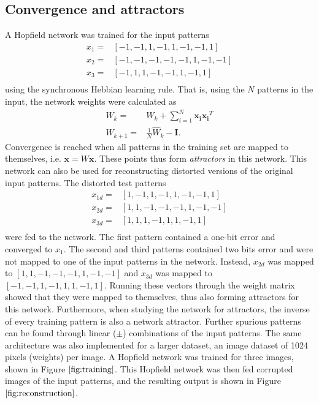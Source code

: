 \documentclass[a4paper]{article}
\begin{document}
\subsection{Convergence and attractors}
A Hopfield network was trained for the input patterns
\begin{align*}
  x_1 =& [-1, -1, 1, -1, 1, -1, -1, 1] \\
  x_2 =& [-1, -1, -1, -1, -1, 1, -1, -1] \\
  x_3 =& [-1, 1, 1, -1, -1, 1, -1, 1] \\
\end{align*}
using the synchronous Hebbian learning rule. That is, using the $N$ patterns in the input, the network weights were calculated as 
\begin{align*}
  \hat{W}_{k} =& W_k + \sum_{i=1}^N \mathbf{x_i} \mathbf{x_i}^T \\
  W_{k+1} =& \frac{1}{N} \hat{W}_{k} - \mathbf{I}.
\end{align*}
Convergence is reached when all patterns in the training set are mapped to themselves, i.e. $\mathbf{x} = W\mathbf{x}$. These points thus form \textit{attractors} in this network.
This network can also be used for reconstructing distorted versions of the original input patterns. The distorted test patterns
\begin{align*}
  x_{1d} =& [1, -1, 1, -1, 1, -1, -1, 1] \\
  x_{2d} =& [1, 1, -1, -1, -1, 1, -1, -1] \\
  x_{3d} =& [1, 1, 1, -1, 1, 1, -1, 1] \\
\end{align*}
were fed to the network. The first pattern contained a one-bit error and converged to $x_1$. The second and third patterns contained two bits error and were not mapped to one of the input patterns in the network. Instead, $x_{2d}$ was mapped to $[1, 1, -1, -1, -1, 1, -1, -1]$ and  $x_{3d}$ was mapped to $[-1, -1,  1, -1,  1,  1, -1, 1]$. Running these vectors through the weight matrix showed that they were mapped to themselves, thus also forming attractors for this network. Furthermore, when studying the network for attractors, the inverse of every training pattern is also a network attractor. Further spurious patterns can be found through linear ($\pm$) combinations of the input patterns.
The same architecture was also implemented for a larger dataset, an image dataset of 1024 pixels (weights) per image. A Hopfield network was trained for three images, shown in Figure $\ref{fig:training}$. This Hopfield network was then fed corrupted images of the input patterns, and the resulting output is shown in Figure $\ref{fig:reconstruction}$.
\end{document}
